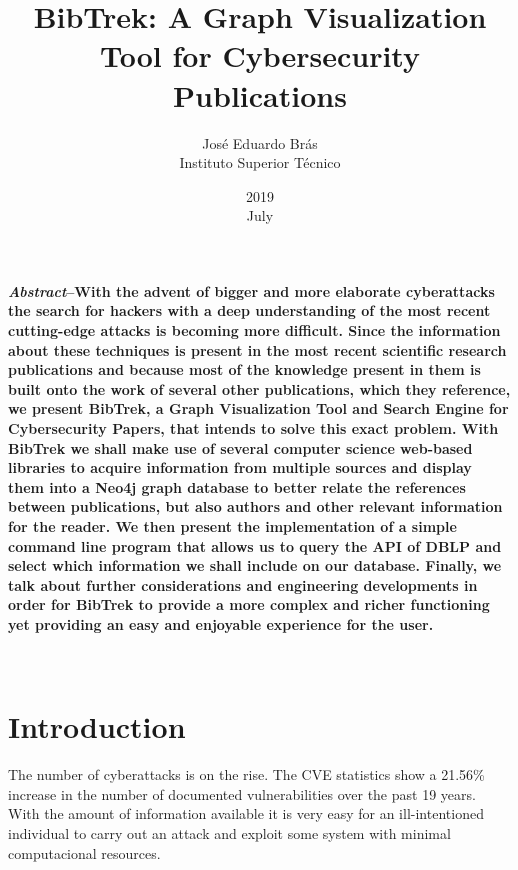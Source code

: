 \documentclass[twocolumn]{article}
\begin{document}
\title{\textbf{BibTrek: A Graph Visualization Tool for Cybersecurity Publications}}
\date{}
\author{Jos\'{e} Eduardo Br\'{a}s\\Instituto Superior T\'{e}cnico}
\date{2019\\ July}
\maketitle

\textbf{\textit{Abstract}--With the advent of bigger and more elaborate cyberattacks the search for hackers with a deep understanding of the most recent cutting-edge attacks is becoming more difficult. Since the information about these techniques is present in the most recent scientific research publications and because most of the knowledge present in them is built onto the work of several other publications, which they reference, we present BibTrek, a Graph Visualization Tool and Search Engine for Cybersecurity Papers, that intends to solve this exact problem. With BibTrek we shall make use of several computer science web-based libraries to acquire information from multiple sources and display them into a Neo4j graph database to better relate the references between publications, but also authors and other relevant information for the reader. We then present the implementation of a simple command line program that allows us to query the API of DBLP and select which information we shall include on our database. Finally, we talk about further considerations and engineering developments in order for BibTrek to provide a more complex and richer functioning yet providing an easy and enjoyable experience for the user.}

\\[1\baselineskip]

\section{Introduction}

The number of cyberattacks is on the rise. The CVE statistics \cite{cvestatisticsbyyear} show a 21.56\% increase in the number of documented vulnerabilities over the past 19 years. With the amount of information available it is very easy for an ill-intentioned individual to carry out an attack and exploit some system with minimal computacional resources.
\end{document}
